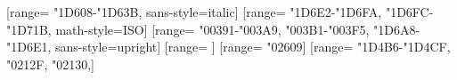 \usepackage{polyglossia}

\usepackage{textcomp}

\usepackage{xltxtra}

\usepackage{unicode-math}
	[range={
		"1D608-"1D63B},	%
		sans-style=italic]
	[range={
		"1D6E2-"1D6FA,	%
		"1D6FC-"1D71B},	%
		math-style=ISO]
	[range={
		"00391-"003A9,	%
		"003B1-"003F5,	%
		"1D6A8-"1D6E1},	%
		sans-style=upright]
	[range={
		\mathbin}] %
	[range={
		"02609}] %
	[range={
		"1D4B6-"1D4CF,
		"0212F,
		"02130,}] %

\usepackage{xeCJK}